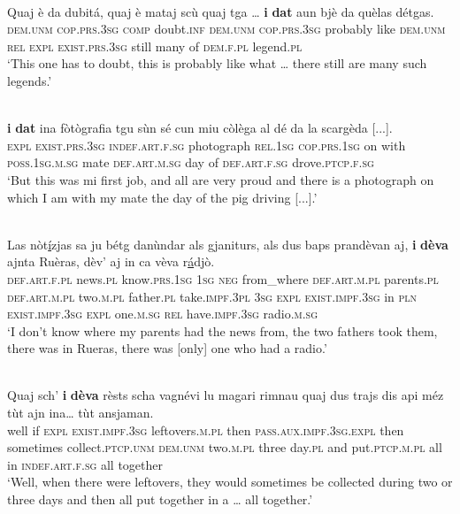 \ea
\label{ex:exist.da1}
\\
\gll  Quaj è da dubitá, quaj è mataj scù quaj tga … \textbf{i} \textbf{dat} aun bjè da quèlas détgas.  \\
\textsc{dem.unm}  \textsc{cop.prs.3sg} \textsc{comp} doubt.\textsc{inf} \textsc{dem.unm} \textsc{cop.prs.3sg} probably like \textsc{dem.unm} \textsc{rel} {} \textsc{expl} \textsc{exist.prs.3sg} still many of  \textsc{dem.f.pl} legend.\textsc{pl}\\
\glt `This one has to doubt, this is probably like what … there still are many such legends.'
\z

\ea
\label{ex:exist.da2}
\\
\gll    [...] \textbf{i} \textbf{dat} ina fòtògrafia tgu sùn sé cun miu còlèga al dé da la scargèda [...].\\
{} \textsc{expl} \textsc{exist.prs.3sg}  \textsc{indef.art.f.sg} photograph \textsc{rel.1sg}  \textsc{cop.prs.1sg} on with \textsc{poss.1sg.m.sg} mate \textsc{def.art.m.sg} day of  \textsc{def.art.f.sg}  drove.\textsc{ptcp.f.sg}\\
\glt `But this was mi first job, and all are very proud and there is a photograph on which I am with my mate the day of the pig driving [...].'
\z

\ea
\label{ex:exist.da3}
\\
\gll    Las nòt\underline{í}zjas sa ju bétg danùndar als gjaniturs, als dus baps prandèvan aj, \textbf{i} \textbf{dèva} ajnta Ruèras, dèv’ aj in ca vèva r\underline{á}djò. \\
\textsc{def.art.f.pl} news.\textsc{pl} know.\textsc{prs.1sg} \textsc{1sg} \textsc{neg} from\_where \textsc{def.art.m.pl} parents.\textsc{pl} \textsc{def.art.m.pl} two.\textsc{m.pl} father.\textsc{pl} take.\textsc{impf.3pl} \textsc{3sg} \textsc{expl} \textsc{exist.impf.3sg} in \textsc{pln} \textsc{exist.impf.3sg} \textsc{expl}  one.\textsc{m.sg} \textsc{rel} have.\textsc{impf.3sg} radio.\textsc{m.sg}\\
\glt `I don’t know where my parents had the news from, the two fathers took them, there was in Rueras, there was [only] one who had a radio.'
\z

\ea
\label{ex:exist.da4}
\\
\gll  Quaj sch’ \textbf{i} \textbf{dèva} rèsts scha vagnévi lu magari rimnau quaj dus trajs dis api méz tùt ajn ina… tùt ansjaman.  \\
well if \textsc{expl} \textsc{exist.impf.3sg} leftovers.\textsc{m.pl} then \textsc{pass.aux.impf.3sg.expl} then sometimes collect.\textsc{ptcp.unm} \textsc{dem.unm} two.\textsc{m.pl} three day.\textsc{pl} and put.\textsc{ptcp.m.pl} all in  \textsc{indef.art.f.sg} all together\\
\glt `Well, when there were leftovers, they would sometimes be collected during two or three days and then all put together in a … all together.'
\z

